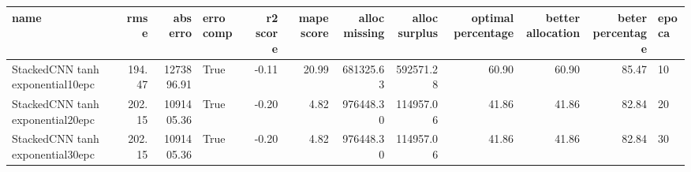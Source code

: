 \begin{tabular}{lrrlrrrrrrrl}
\toprule
name & rmse & abs erro & erro comp & r2 score & mape score & alloc missing & alloc surplus & optimal percentage & better allocation & beter percentage & epoca \\
\midrule
StackedCNN tanh exponential10epc & 194.47 & 1273896.91 & True & -0.11 & 20.99 & 681325.63 & 592571.28 & 60.90 & 60.90 & 85.47 & 10 \\
StackedCNN tanh exponential20epc & 202.15 & 1091405.36 & True & -0.20 & 4.82 & 976448.30 & 114957.06 & 41.86 & 41.86 & 82.84 & 20 \\
StackedCNN tanh exponential30epc & 202.15 & 1091405.36 & True & -0.20 & 4.82 & 976448.30 & 114957.06 & 41.86 & 41.86 & 82.84 & 30 \\
\bottomrule
\end{tabular}
